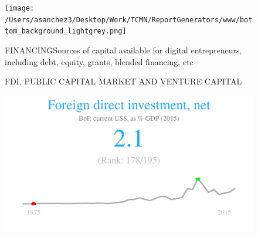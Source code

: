 \documentclass{article}\usepackage[]{graphicx}\usepackage[]{color}
\makeatletter
\def\maxwidth{ %
  \ifdim\Gin@nat@width>\linewidth
    \linewidth
  \else
    \Gin@nat@width
  \fi
}
\makeatother
\begin{document}

\clearpage
\begin{figure}
  \vspace{108ex} %
  \texttt{[image: /Users/asanchez3/Desktop/Work/TCMN/ReportGenerators/www/bottom\_background\_lightgrey.png]}
\end{figure}

\begin{figure}
\vspace*{-27.5cm}
\hspace*{+1cm}
\begin{minipage}[c]{0.95\textwidth}
  \begin{minipage}[c]{0.95\textwidth}
    \begin{flushleft}  
     \Large{\textcolor[HTML]{22A6F5}{FINANCING}}\hspace{2ex}\small{\textcolor[HTML]{818181} {Sources of capital available for digital entrepreneurs, including debt, equity, grants, blended financing, etc}}
    \end{flushleft} 
     \small{\textcolor[HTML]{818181}{FDI, PUBLIC CAPITAL MARKET AND VENTURE CAPITAL}}
      \\[4pt]
      \begin{minipage}[c]{0.32\textwidth}  


{\centering \includegraphics[width=\maxwidth]{figure/figure_sparkline_Fin1-1} 

}



      \end{minipage}
      \begin{minipage}[c]{0.32\textwidth}



\end{minipage}
\end{minipage}
\end{minipage}
\end{figure}
\end{document}
